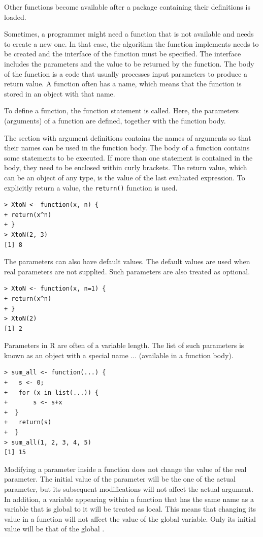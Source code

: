 Other functions become available after a package containing their definitions
is loaded.

Sometimes, a programmer might need a function that is not available and
needs to create a new one. In that case, the algorithm the function implements
needs to be created and the interface of the function must be specified. The interface includes the parameters and the value to be returned by the function. The
body of the function is a code that usually processes input parameters to produce
a return value. A function often has a name, which means that the function is
stored in an object with that name.

To define a function, the function statement is called. Here, the parameters
(arguments) of a function are defined, together with the function body.

The section with argument definitions contains the names of arguments so
that their names can be used in the function body. The body of a function contains
some statements to be executed. If more than one statement is contained in the
body, they need to be enclosed within curly brackets. The return value, which
can be an object of any type, is the value of the last evaluated expression. To
explicitly return a value, the \texttt{return()} function is used.

\begin{verbatim}
> XtoN <- function(x, n) {
+ return(x^n)
+ }
> XtoN(2, 3)
[1] 8
\end{verbatim}

The parameters can also have default values. The default values are used
when real parameters are not supplied. Such parameters are also treated as optional.

\begin{verbatim}
> XtoN <- function(x, n=1) {
+ return(x^n)
+ }
> XtoN(2)
[1] 2
\end{verbatim}

Parameters in R are often of a variable length. The list of such parameters is
known as an object with a special name ... (available in a function body).

\begin{verbatim}
> sum_all <- function(...) {
+   s <- 0;
+   for (x in list(...)) {
+       s <- s+x
+  }
+   return(s)
+  }
> sum_all(1, 2, 3, 4, 5)
[1] 15
\end{verbatim}

Modifying a parameter inside a function does not change the value of the
real parameter. The initial value of the parameter will be the one of the actual
parameter, but its subsequent modifications will not affect the actual argument.
In addition, a variable appearing within a function that has the same name as a
variable that is global to it will be treated as local. This means that changing its
value in a function will not affect the value of the global variable. Only its initial
value will be that of the global \cite{ref183}.

